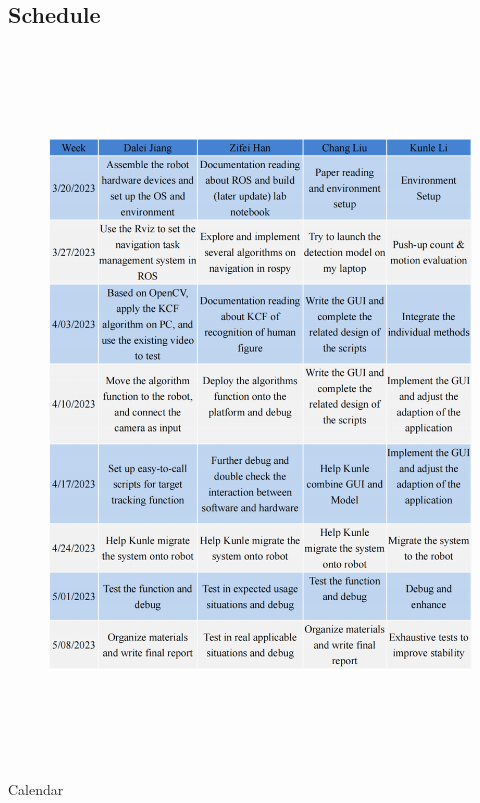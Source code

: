 \subsection{Schedule}
\begin{figure}[H]
    \centering
    \includegraphics[width=15cm, height=18.9cm]{sections/Calendar.png}
\end{figure}
\begin{table}[H]
    \centering
    \begin{tabular}{c|c}
    \end{tabular}
    \caption{Calendar}
\end{table}
